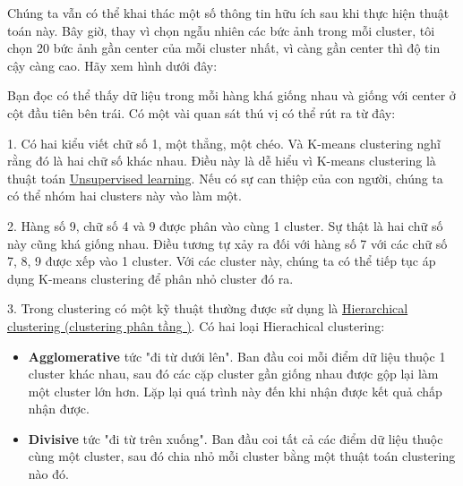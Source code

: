 Chúng ta vẫn có thể khai thác một số thông tin hữu ích sau khi thực hiện thuật toán này. Bây giờ, thay vì chọn ngẫu nhiên các bức ảnh trong mỗi cluster, tôi chọn 20 bức ảnh gần center của mỗi cluster nhất, vì càng gần center thì độ tin cậy càng cao. Hãy xem hình dưới đây: 
 
 
 
Bạn đọc có thể thấy dữ liệu trong mỗi hàng khá giống nhau và giống với center ở cột đầu tiên bên trái. Có một vài quan sát thú vị có thể rút ra từ đây:  
 
1. Có hai kiểu viết chữ số 1, một thẳng, một chéo. Và K-means clustering nghĩ rằng đó là hai chữ số khác nhau. Điều này là dễ hiểu vì K-means clustering là thuật toán \href{http://machinelearningcoban.com/2016/12/27/categories/#unsupervised-learning-hoc-khong-giam-sat}{Unsupervised learning}. Nếu có sự can thiệp của con người, chúng ta có thể nhóm hai clusters này vào làm một. 
 
2. Hàng số 9, chữ số 4 và 9 được phân vào cùng 1 cluster. Sự thật là hai chữ số này cũng khá giống nhau. Điều tương tự xảy ra đối với hàng số 7 với các chữ số 7, 8, 9 được xếp vào 1 cluster. Với các cluster này, chúng ta có thể tiếp tục áp dụng K-means clustering để phân nhỏ cluster đó ra.  
 
3. Trong clustering có một kỹ thuật thường được sử dụng là \href{https://en.wikipedia.org/wiki/Hierarchical_clustering}{Hierarchical clustering (clustering phân tầng )}. Có hai loại Hierachical clustering: 
 
\begin{itemize}
	\item \textbf{Agglomerative} tức "đi từ dưới lên". Ban đầu coi mỗi điểm dữ liệu thuộc 1 cluster khác nhau, sau đó các cặp cluster gần giống nhau được gộp lại làm một cluster lớn hơn. Lặp lại quá trình này đến khi nhận được kết quả chấp nhận được.

	\item \textbf{Divisive} tức "đi từ trên xuống". Ban đầu coi tất cả các điểm dữ liệu thuộc cùng một cluster, sau đó chia nhỏ mỗi cluster bằng một thuật toán clustering nào đó.  
 
\end{itemize}
 
